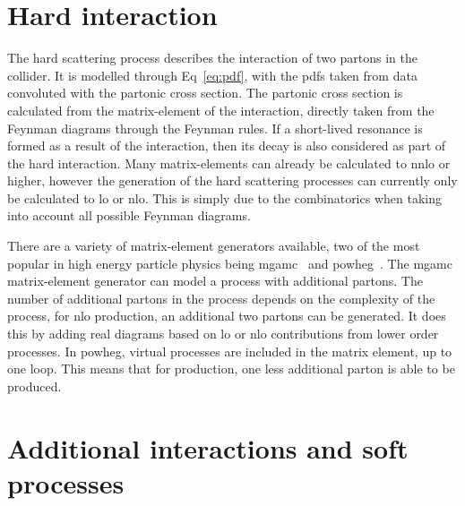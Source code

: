 \section{Hard interaction} %
\label{sec:hard_interaction}
The hard scattering process describes the interaction of two partons in the collider.
It is modelled through Eq~\ref{eq:pdf}, with the \acrshort{pdf}s taken from data convoluted with the partonic cross section.
The partonic cross section is calculated from the matrix-element of the interaction, directly taken from the Feynman diagrams through the Feynman rules.
If a short-lived resonance is formed as a result of the interaction, then its decay is also considered as part of the hard interaction.
Many matrix-elements can already be calculated to \acrshort{nnlo} or higher, however the generation of the hard scattering processes can currently only be calculated to \acrshort{lo} or \acrshort{nlo}.
This is simply due to the combinatorics when taking into account all possible Feynman diagrams.

There are a variety of matrix-element generators available, two of the most popular in high energy particle physics being \acrfull{mgamc}~\cite{Gen:MGamc} and \acrfull{powheg}~\cite{Gen:Pow1,Gen:Pow2,Gen:Pow3}.
The \acrshort{mgamc} matrix-element generator can model a process with additional partons.
The number of additional partons in the process depends on the complexity of the process, \eg{} for \acrshort{nlo} \ttbar{} production, an additional two partons can be generated.
It does this by adding real diagrams based on \acrshort{lo} or \acrshort{nlo} contributions from lower order processes.
In \acrshort{powheg}, virtual processes are included in the matrix element, up to one loop. 
This means that for \ttbar{} production, one less additional parton is able to be produced.



\section{Additional interactions and soft processes} %
\label{sec:additional_interactions_and_soft_processes}

